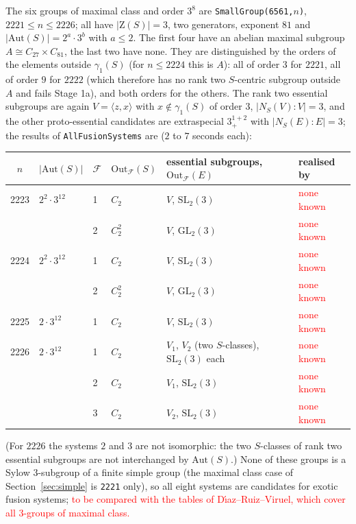 \documentclass[11pt]{article}
\theoremstyle{definition}
\theoremstyle{remark}
\newcommand{\F}{\mathcal{F}}
\newcommand{\Aut}{\mathrm{Aut}}
\newcommand{\Out}{\mathrm{Out}}
\newcommand{\GL}{\mathrm{GL}}
\newcommand{\SL}{\mathrm{SL}}
\newcommand{\Z}{\mathrm{Z}}
\begin{document}
The six groups of maximal class and order $3^8$ are
\texttt{SmallGroup(6561,}$n$\texttt{)}, $2221\le n\le2226$; all have
$|\Z(S)|=3$, two generators, exponent $81$ and $|\Aut(S)|=2^a\cdot3^{b}$
with $a\le2$.  The first four have an abelian maximal subgroup
$A\cong C_{27}\times C_{81}$, the last two have none.  They are
distinguished by the orders of the elements outside $\gamma_1(S)$ (for
$n\le2224$ this is $A$): all of order $3$ for $2221$, all of order $9$ for
$2222$ (which therefore has no rank two $S$-centric subgroup outside $A$
and fails Stage 1a), and both orders for the others.  The rank two
essential subgroups are again $V=\langle z,x\rangle$ with $x\notin\gamma_1(S)$
of order $3$, $|N_S(V):V|=3$, and the other proto-essential candidates are
extraspecial $3^{1+2}_+$ with $|N_S(E):E|=3$; the results of
\texttt{AllFusionSystems} are ($2$ to $7$ seconds each):
\begin{center}
\begin{tabular}{clllll}
\toprule
$n$ & $|\Aut(S)|$ & $\F$ & $\Out_\F(S)$ & essential subgroups, $\Out_\F(E)$ & realised by\\
\midrule
2223 & $2^2\cdot3^{12}$ & 1 & $C_2$ & $V$, $\SL_2(3)$ & \textcolor{red}{none known}\\
     &                  & 2 & $C_2^2$ & $V$, $\GL_2(3)$ & \textcolor{red}{none known}\\
2224 & $2^2\cdot3^{12}$ & 1 & $C_2$ & $V$, $\SL_2(3)$ & \textcolor{red}{none known}\\
     &                  & 2 & $C_2^2$ & $V$, $\GL_2(3)$ & \textcolor{red}{none known}\\
2225 & $2\cdot3^{12}$   & 1 & $C_2$ & $V$, $\SL_2(3)$ & \textcolor{red}{none known}\\
2226 & $2\cdot3^{12}$   & 1 & $C_2$ & $V_1$, $V_2$ (two $S$-classes), $\SL_2(3)$ each & \textcolor{red}{none known}\\
     &                  & 2 & $C_2$ & $V_1$, $\SL_2(3)$ & \textcolor{red}{none known}\\
     &                  & 3 & $C_2$ & $V_2$, $\SL_2(3)$ & \textcolor{red}{none known}\\
\bottomrule
\end{tabular}
\end{center}
(For $2226$ the systems $2$ and $3$ are not isomorphic: the two $S$-classes
of rank two essential subgroups are not interchanged by $\Aut(S)$.)  None of
these groups is a Sylow $3$-subgroup of a finite simple group (the
maximal class case of Section~\ref{sec:simple} is \texttt{2221} only), so
all eight systems are candidates for exotic fusion systems; \textcolor{red}{to
be compared with the tables of D\'{\i}az--Ruiz--Viruel, which cover all
$3$-groups of maximal class.}
\end{document}
